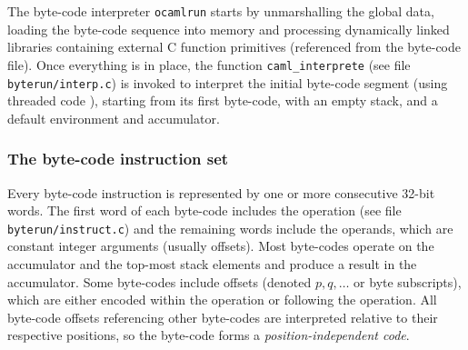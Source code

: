 \documentclass[10pt,a4paper,twocolumn]{article}
\begin{document}
The byte-code interpreter \texttt{ocamlrun} starts by unmarshalling the global data, loading
the byte-code sequence into memory and processing dynamically linked libraries containing
external C function primitives (referenced from the byte-code file). Once everything is in
place, the function \texttt{caml\_interprete} (see file \texttt{byterun/interp.c}) is invoked
to interpret the initial byte-code segment (using threaded code \cite{Bell73,ErtlGregg03}),
starting from its first byte-code, with an empty stack, and a default environment and accumulator.

\subsubsection{The byte-code instruction set}

Every byte-code instruction is represented by one or more consecutive 32-bit words. The
first word of each byte-code includes the operation (see file \texttt{byterun/instruct.c})
and the remaining words include the operands, which are constant integer arguments (usually
offsets). Most byte-codes operate on the accumulator and the top-most stack elements and
produce a result in the accumulator. Some byte-codes include offsets (denoted $p,q,\ldots$
or byte subscripts), which are either encoded within the operation or following the
operation. All byte-code offsets referencing other byte-codes are interpreted relative to their
respective positions, so the byte-code forms a \emph{position-independent code}.
\end{document}
